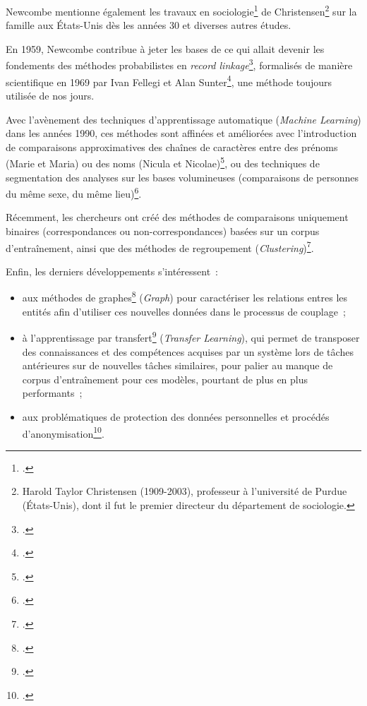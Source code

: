 \documentclass[a4paper,12pt,twoside]{book}
\begin{document}
			    Newcombe mentionne également les travaux en sociologie\footcite[Voir~:][]{christensenMethodRecordLinkage1958} de Christensen\footnote{Harold Taylor Christensen (1909-2003), professeur à l'université de Purdue (États-Unis), dont il fut le premier directeur du département de sociologie.} sur la famille aux États-Unis dès les années 30 et diverses autres études.
			    
			    En 1959, Newcombe contribue à jeter les bases de ce qui allait devenir les fondements des méthodes probabilistes en \textit{record linkage}\footcite{newcombeAutomaticLinkageVital1959}, formalisés de manière scientifique en 1969 par Ivan Fellegi et Alan Sunter\footcite{fellegiTheoryRecordLinkage1969}, une méthode toujours utilisée de nos jours.
			    
			    Avec l'avènement des techniques d'apprentissage automatique (\textit{Machine Learning}) dans les années 1990, ces méthodes sont affinées et améliorées avec l'introduction de comparaisons approximatives des chaînes de caractères entre des prénoms (Marie et Maria) ou des noms (Nicula et Nicolae)\footcites{christenDataMatchingConcepts2012,herzogDataQualityRecord2007a}, ou des techniques de segmentation des analyses sur les bases volumineuses (comparaisons de personnes du même sexe, du même lieu)\footcite{christenDataMatchingConcepts2012}.
			    
			    Récemment, les chercheurs ont créé des méthodes de comparaisons uniquement binaires (correspondances ou non-correspondances) basées sur un corpus d'entraînement, ainsi que des méthodes de regroupement (\textit{Clustering})\footcite{handNoteUsingFmeasure2018}.
			    
			    Enfin, les derniers développements s'intéressent~:
			    
			    \begin{itemize}
    			    \item
    			    aux méthodes de graphes\footcite{kirielleUnsupervisedGraphbasedEntity} (\textit{Graph}) pour caractériser les relations entres les entités afin d'utiliser ces nouvelles données dans le processus de couplage~;
    			    \item
    			    à l'apprentissage par transfert\footcite{kirielleTransERHomogeneousTransfer} (\textit{Transfer Learning}), qui permet de transposer des connaissances et des compétences acquises par un système lors de tâches antérieures sur de nouvelles tâches similaires, pour palier au manque de corpus d'entraînement pour ces modèles, pourtant de plus en plus performants~;
    			    \item
    			    aux problématiques de protection des données personnelles et procédés d'anonymisation\footcite{christenLinkingSensitiveData2021a}.
    			 \end{itemize}
			    
\end{document}
